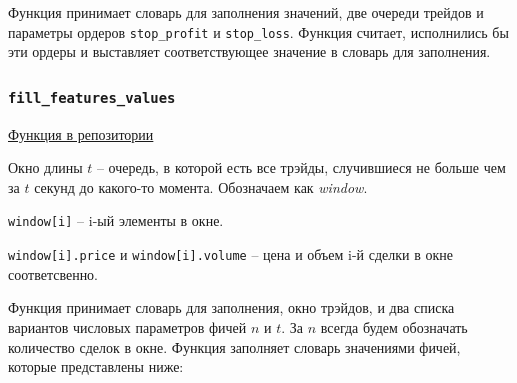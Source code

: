 Функция принимает словарь для заполнения значений, две очереди трейдов и параметры ордеров \texttt{stop\_profit} и \texttt{stop\_loss}. Функция считает, исполнились бы эти ордеры и выставляет соответствующее значение в словарь для заполнения.

\subsubsection{\texttt{fill\_features\_values}}
\href{https://github.com/dexety/dex-trading-system/blob/ca0370d602f2dfa05262b9b8574002f965ac1502/utils/indicators.py#L48}{Функция в репозитории}

\begin{designation}
Окно длины $t$ -- очередь, в которой есть все трэйды, случившиеся не больше чем за $t$ секунд до какого-то момента. Обозначаем как \textit{window}.
\end{designation}

\begin{designation}
    \texttt{window[i]} -- i-ый элементы в окне.
\end{designation}
\begin{designation}
    \texttt{window[i].price} и \texttt{window[i].volume} -- цена и объем i-й сделки в окне соответсвенно.
\end{designation}

Функция принимает словарь для заполнения, окно трэйдов, и два списка вариантов числовых параметров фичей $n$ и $t$. За $n$ всегда будем обозначать количество сделок в окне. Функция заполняет словарь значениями фичей, которые представлены ниже:


